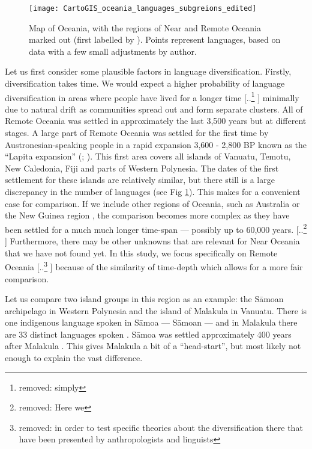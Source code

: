 \documentclass[unnumsec,webpdf,modern,medium]{oup-authoring-template}
\providecommand{\DIFaddtex}[1]{{\protect\color{blue} \sf #1}} %
\providecommand{\DIFdeltex}[1]{{\protect\color{red} [..\footnote{removed: #1} ]}} %
\providecommand{\DIFaddbegin}{} %
\providecommand{\DIFaddend}{} %
\providecommand{\DIFdelbegin}{} %
\providecommand{\DIFdelend}{} %
\providecommand{\DIFadd}[1]{\texorpdfstring{\DIFaddtex{#1}}{#1}} %
\providecommand{\DIFdel}[1]{\texorpdfstring{\DIFdeltex{#1}}{}} %
\newcommand{\DIFscaledelfig}{0.5}
\newlength{\DIFdelgraphicswidth} %
\newlength{\DIFdelgraphicsheight} %
\newcommand{\DIFaddincludegraphics}[2][]{{\color{blue}\fbox{\DIFOincludegraphics[#1]{#2}}}} %
\newcommand{\DIFdelincludegraphics}[2][]{%
\sbox{\DIFdelgraphicsbox}{\DIFOincludegraphics[#1]{#2}}%
\settoboxwidth{\DIFdelgraphicswidth}{\DIFdelgraphicsbox} %
\settoboxtotalheight{\DIFdelgraphicsheight}{\DIFdelgraphicsbox} %
\scalebox{\DIFscaledelfig}{%
\parbox[b]{\DIFdelgraphicswidth}{\usebox{\DIFdelgraphicsbox}\\[-\baselineskip] \rule{\DIFdelgraphicswidth}{0em}}\llap{\resizebox{\DIFdelgraphicswidth}{\DIFdelgraphicsheight}{%
\setlength{\unitlength}{\DIFdelgraphicswidth}%
\begin{picture}(1,1)%
\thicklines\linethickness{2pt} %
{\color[rgb]{1,0,0}\put(0,0){\framebox(1,1){}}}%
{\color[rgb]{1,0,0}\put(0,0){\line( 1,1){1}}}%
{\color[rgb]{1,0,0}\put(0,1){\line(1,-1){1}}}%
\end{picture}%
}\hspace*{3pt}}} %
} %
\DeclareRobustCommand{\DIFaddbegin}{\DIFOaddbegin \let\includegraphics\DIFaddincludegraphics} %
\DeclareRobustCommand{\DIFaddend}{\DIFOaddend \let\includegraphics\DIFOincludegraphics} %
\DeclareRobustCommand{\DIFdelbegin}{\DIFOdelbegin \let\includegraphics\DIFdelincludegraphics} %
\DeclareRobustCommand{\DIFdelend}{\DIFOaddend \let\includegraphics\DIFOincludegraphics} %
\begin{document}
\begin{figure}
\centering
\texttt{[image: CartoGIS\_oceania\_languages\_subgreions\_edited]}
\caption{Map of Oceania, with the regions of Near and Remote Oceania marked out (first labelled by \citet{pawley1973dating}). Points represent languages, based on data \citet{glottolog3} with a few small adjustments by author.} 
\label{RO_overnight_coloured_dots}
\end{figure}

Let us first consider some plausible factors in language diversification. Firstly, diversification takes time. We would expect a higher probability of language diversification in areas where people have lived for a longer time \DIFdelbegin \DIFdel{simply }\DIFdelend \DIFaddbegin \DIFadd{minimally }\DIFaddend due to natural drift as communities spread out and form separate clusters. All of Remote Oceania was settled in approximately the last 3,500 years but at different stages. A large part of Remote Oceania was settled for the first time by Austronesian-speaking people in a rapid expansion 3,600 - 2,800 BP known as the ``Lapita expansion'' (\citet[106-7]{bellwood2006austronesians}; \citet[137]{rieth_cochrane_2018}). This first area covers all islands of Vanuatu, Temotu, New Caledonia, Fiji and parts of Western Polynesia. The dates of the first settlement for these islands are relatively similar, but there still is a large discrepancy in the number of languages (see Fig \ref{RO_overnight_coloured_dots}). This makes for a convenient case for comparison. If we include other regions of Oceania, such as Australia or the New Guinea region \citep{ross2017_new_guinea_region}, the comparison becomes more complex as they have been settled for a much much longer time-span --- possibly up to 60,000 years. \DIFdelbegin \DIFdel{Here we }\DIFdelend \DIFaddbegin \DIFadd{Furthermore, there may be other unknowns that are relevant for Near Oceania that we have not found yet. In this study, we }\DIFaddend focus specifically on Remote Oceania \DIFdelbegin \DIFdel{in order to test specific theories about the diversification there that have been presented by anthropologists and linguists}\DIFdelend \DIFaddbegin \DIFadd{because of the similarity of time-depth which allows for a more fair comparison}\DIFaddend .

Let us compare two island groups in this region as an example: the S\={a}moan archipelago in Western Polynesia and the island of Malakula in Vanuatu. There is one indigenous language spoken in S\={a}moa ---  S\={a}moan --- and in Malakula there are 33 distinct languages spoken \citep{glottolog3}. S\={a}moa was settled approximately 400 years after Malakula \citep[137-8]{rieth_cochrane_2018}. This gives Malakula a bit of a ``head-start'', but most likely not enough to explain the vast difference.
\end{document}
